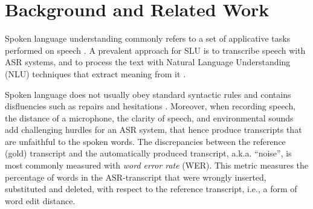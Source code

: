 

\section{Background and Related Work}
\label{sec_related_work}

Spoken language understanding \citep[SLU;][]{wang2005slu} commonly refers to a set of applicative tasks performed on speech \citep{feng2022asrglue, shon-etal-2023-slue}. A prevalent approach for SLU is to transcribe speech with ASR systems, and to process the text with Natural Language Understanding (NLU) techniques that extract meaning from it \citep{tur2011slu}.

Spoken language does not usually obey standard syntactic rules and contains disfluencies such as repairs and hesitations \citep{wang2005slu}. Moreover, when recording speech, the distance of a microphone, the clarity of speech, and environmental sounds add challenging hurdles for an ASR system, that hence produce transcripts that are unfaithful to the spoken words. The discrepancies between the reference (gold) transcript and the automatically produced transcript, a.k.a. ``noise'', is most commonly measured with \textit{word error rate} (WER). This metric measures the percentage of words in the ASR-transcript that were wrongly inserted, substituted and deleted, with respect to the reference transcript, i.e., a form of word edit distance.

